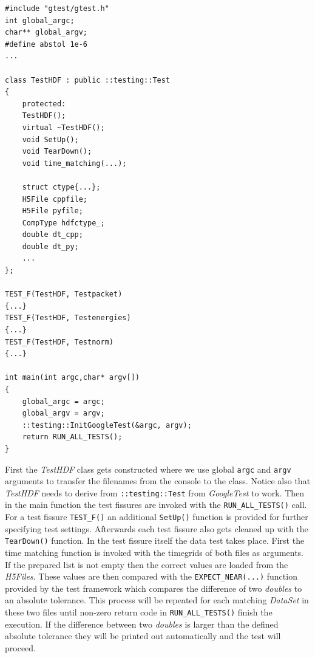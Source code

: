 \begin{lstlisting}
#include "gtest/gtest.h"
int global_argc;
char** global_argv;
#define abstol 1e-6
...

class TestHDF : public ::testing::Test
{
	protected:
	TestHDF();
	virtual ~TestHDF();
	void SetUp();
	void TearDown();
	void time_matching(...);
	
	struct ctype{...};
	H5File cppfile;
	H5File pyfile;
	CompType hdfctype_;
	double dt_cpp;
	double dt_py;
	...
};

TEST_F(TestHDF, Testpacket)
{...}
TEST_F(TestHDF, Testenergies)
{...}
TEST_F(TestHDF, Testnorm)
{...}

int main(int argc,char* argv[])
{
	global_argc = argc;
	global_argv = argv;
	::testing::InitGoogleTest(&argc, argv);
	return RUN_ALL_TESTS();
}
\end{lstlisting}
First the \textit{TestHDF} class gets constructed where we use global \texttt{argc} and \texttt{argv} arguments to transfer the filenames from the console to the class. Notice also that \textit{TestHDF} needs to derive from \texttt{::testing::Test} from \textit{GoogleTest} to work. Then in the main function the test fissures are invoked with the \texttt{RUN\_ALL\_TESTS()} call. For a test fissure \texttt{TEST\_F()} an additional \texttt{SetUp()} function is provided for further specifying test settings. Afterwards each test fissure also gets cleaned up with the \texttt{TearDown()} function. In the test fissure itself the data test takes place. First the time matching function is invoked with the timegrids of both files as arguments. If the prepared list is not empty then the correct values are loaded from the \textit{H5Files}. These values are then compared with the \texttt{EXPECT\_NEAR(...)} function provided by the test framework which compares the difference of two \textit{doubles} to an absolute tolerance. This process will be repeated for each matching \textit{DataSet} in these two files until non-zero return code in \texttt{RUN\_ALL\_TESTS()} finish the execution. If the difference between two \textit{doubles} is larger than the defined absolute tolerance they will be printed out automatically and the test will proceed.

